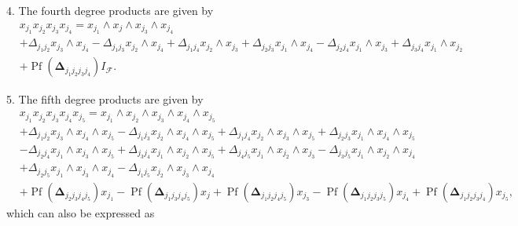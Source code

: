 \documentclass[aps, preprint]{revtex4}
\begin{document}
4. The fourth degree products are given by
\begin{align} & x_{j_{1}} x_{j_{2}} x_{j_{3}} x_{j_{4}} =x_{j_{1}} \wedge x_{j} \wedge x_{j_{3}} \wedge x_{j_{4}} \nonumber  \\
 &  + \Delta _{j_{1} j_{2}}x_{j_{3}} \wedge x_{j_{4}} - \Delta _{j_{1} j_{3}}x_{j_{2}} \wedge x_{j_{4}} + \Delta _{j_{1} j_{4}}x_{j_{2}} \wedge x_{j_{3}} + \Delta _{j_{2} j_{3}}x_{j_{1}} \wedge x_{j_{4}} - \Delta _{j_{2} j_{4}}x_{j_{1}} \wedge x_{j_{3}} + \Delta _{j_{3} j_{4}}x_{j_{1}} \wedge x_{j_{2}} \nonumber  \\
 &  +\ensuremath{\operatorname*{Pf}} \left (\mathbf{\Delta }_{j_{1} j_{2} j_{3} j_{4}}\right ) I_{\mathcal{F}}\text{.}\end{align}

5. The fifth degree products are given by
\begin{align} & x_{j_{1}} x_{j_{2}} x_{j_{3}} x_{j_{4}} x_{j_{5}} =x_{j_{1}} \wedge x_{j_{2}} \wedge x_{j_{3}} \wedge x_{j_{4}} \wedge x_{j_{5}} \nonumber  \\
 &  + \Delta _{j_{1} j_{2}}x_{j_{3}} \wedge x_{j_{4}} \wedge x_{j_{5}} - \Delta _{j_{1} j_{3}}x_{j_{2}} \wedge x_{j_{4}} \wedge x_{j_{5}} + \Delta _{j_{1} j_{4}}x_{j_{2}} \wedge x_{j_{3}} \wedge x_{j_{5}} + \Delta _{j_{2} j_{3}}x_{j_{1}} \wedge x_{j_{4}} \wedge x_{j_{5}} \nonumber  \\
 &  - \Delta _{j_{2} j_{4}}x_{j_{1}} \wedge x_{j_{3}} \wedge x_{j_{5}} + \Delta _{j_{3} j_{4}}x_{j_{1}} \wedge x_{j_{2}} \wedge x_{j_{5}} + \Delta _{j_{4} j_{5}}x_{j_{1}} \wedge x_{j_{2}} \wedge x_{j_{3}} - \Delta _{j_{3} j_{5}}x_{j_{1}} \wedge x_{j_{2}} \wedge x_{j_{4}} \nonumber  \\
 &  + \Delta _{j_{2} j_{5}}x_{j_{1}} \wedge x_{j_{3}} \wedge x_{j_{4}} - \Delta _{j_{1} j_{5}}x_{j_{2}} \wedge x_{j_{3}} \wedge x_{j_{4}} \nonumber  \\
 &  +\ensuremath{\operatorname*{Pf}} \left (\mathbf{\Delta }_{j_{2} j_{3} j_{4} j_{5}}\right ) x_{j_{1}} -\ensuremath{\operatorname*{Pf}} \left (\mathbf{\Delta }_{j_{1} j_{3} j_{4} j_{5}}\right ) x_{j} +\ensuremath{\operatorname*{Pf}} \left (\mathbf{\Delta }_{j_{1} j_{2} j_{4} j_{5}}\right ) x_{j_{3}} -\ensuremath{\operatorname*{Pf}} \left (\mathbf{\Delta }_{j_{1} j_{2} j_{3} j_{5}}\right ) x_{j_{4}} +\ensuremath{\operatorname*{Pf}} \left (\mathbf{\Delta }_{j_{1} j_{2} j_{3} j_{4}}\right ) x_{j_{5}}\text{,}\end{align}which can also be expressed as
\end{document}

